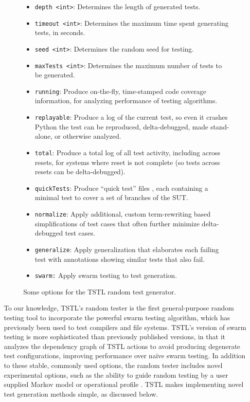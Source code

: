 \begin{figure}
{\scriptsize
\begin{itemize}
\item {\tt depth <int>}: Determines the length of generated tests.
\item {\tt timeout <int>}: Determines the maximum time spent generating tests, in seconds.
\item {\tt seed <int>}: Determines the random seed for testing.
\item {\tt maxTests <int>}: Determines the maximum number of tests to be generated.
\item {\tt running}: Produce on-the-fly, time-stamped code coverage information, for analyzing performance of testing algorithms. 
\item {\tt replayable}: Produce a log of the current test, so even it crashes Python the test can be reproduced, delta-debugged, made stand-alone, or otherwise analyzed.
\item {\tt total}: Produce a total log of all test activity, including across resets, for systems where reset is not complete (so tests across resets can be delta-debugged).
\item {\tt quickTests}:  Produce ``quick test'' files \cite{icst14}, each containing a minimal test to cover a set of branches of the SUT. 
\item {\tt normalize}: Apply additional, custom term-rewriting based simplifications of test cases that often further minimize delta-debugged test cases. 
\item {\tt generalize}: Apply generalization that elaborates each failing test with annotations showing similar tests that also fail. 
\item {\tt swarm:}  Apply swarm testing \cite{ISSTA12} to test generation.
\end{itemize}
}
\caption{Some options for the TSTL random test generator.}
\label{tab:rt}
\end{figure}

To our knowledge, TSTL's random tester is the first general-purpose random testing tool to incorporate the powerful swarm testing \cite{ISSTA12} algorithm, which has previously been used to test compilers \cite{ISSTA13,ZhendongPLDI14} and file systems.  TSTL's version of swarm testing is more sophisticated than previously published versions, in that it analyzes the dependency graph of TSTL actions to avoid producing degenerate test configurations, improving performance over na\"ive swarm testing.  In addition to these stable, commonly used options, the random tester includes novel experimental options, such as the ability to guide random testing by a user supplied Markov model or operational profile \cite{Hamlet94}.  TSTL makes implementing novel test generation methods simple, as discussed below.

